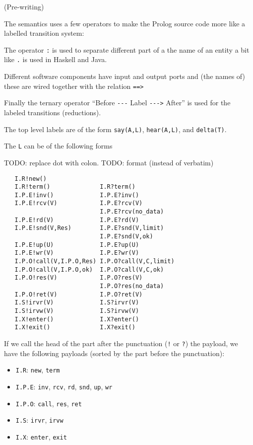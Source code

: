 (Pre-writing)

The semantics uses a few operators to make the Prolog source code more
like a labelled transition system:

The operator \verb+:+ is used to separate different part of a the name of
an entity a bit like \verb+.+ is used in Haskell and Java.

Different software components have input and output ports and (the
names of) these are wired together with the relation \verb+==>+

Finally the ternary operator ``Before \verb+---+ Label \verb+--->+
After'' is used for the labeled transitions (reductions).

The top level labels are of the form \verb+say(A,L)+,
\verb+hear(A,L)+, and \verb+delta(T)+.

The \verb+L+ can be of the following forms

TODO: replace dot with colon.
TODO: format (instead of verbatim)

\begin{verbatim}
   I.R!new()
   I.R!term()              I.R?term()
   I.P.E!inv()             I.P.E?inv()
   I.P.E!rcv(V)            I.P.E?rcv(V)
                           I.P.E?rcv(no_data)
   I.P.E!rd(V)             I.P.E?rd(V)
   I.P.E!snd(V,Res)        I.P.E?snd(V,limit)
                           I.P.E?snd(V,ok)
   I.P.E!up(U)             I.P.E?up(U)
   I.P.E!wr(V)             I.P.E?wr(V)
   I.P.O!call(V,I.P.O,Res) I.P.O?call(V,C,limit)
   I.P.O!call(V,I.P.O,ok)  I.P.O?call(V,C,ok)
   I.P.O!res(V)            I.P.O?res(V)
                           I.P.O?res(no_data)
   I.P.O!ret(V)            I.P.O?ret(V)
   I.S!irvr(V)             I.S?irvr(V)
   I.S!irvw(V)             I.S?irvw(V)
   I.X!enter()             I.X?enter()
   I.X!exit()              I.X?exit()
\end{verbatim}

If we call the head of the part after the punctuation (\verb+!+ or
\verb+?+) the payload, we have the following payloads (sorted by the
part before the punctuation):

\begin{itemize}
\item \verb+I.R+:   \verb+new+, \verb+term+
\item \verb+I.P.E+: \verb+inv+, \verb+rcv+, \verb+rd+, \verb+snd+, \verb+up+, \verb+wr+
\item \verb+I.P.O+: \verb+call+, \verb+res+, \verb+ret+
\item \verb+I.S+:   \verb+irvr+, \verb+irvw+
\item \verb+I.X+:   \verb+enter+, \verb+exit+
\end{itemize}


